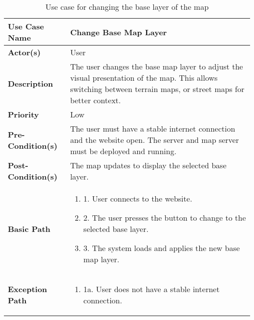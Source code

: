 \begin{table}[h]
    \centering
    \renewcommand{\arraystretch}{1.5}
    \begin{tabularx}{\textwidth}{|l|X|}
        \hline
        \rowcolor{gray!20}
        \textbf{Use Case Name} & Change Base Map Layer \\
        \hline
        \textbf{Actor(s)} & User \\
        \hline
        \textbf{Description} & The user changes the base map layer to adjust the visual presentation of the map. This allows switching between terrain maps, or street maps for better context. \\
        \hline
        \textbf{Priority} & Low \\
        \hline
        \textbf{Pre-Condition(s)} & The user must have a stable internet connection and the website open. The server and map server must be deployed and running. \\
        \hline
        \textbf{Post-Condition(s)} & The map updates to display the selected base layer. \\
        \hline
        \textbf{Basic Path} &  
        \begin{enumerate}[label=,left=0pt]
            \item 1. User connects to the website.
            \item 2. The user presses the button to change to the selected base layer.
            \item 3. The system loads and applies the new base map layer.
        \end{enumerate} \\
        \hline
        \textbf{Exception Path} & 
        \begin{enumerate}[label=,left=0pt]
            \item 1a. User does not have a stable internet connection.
        \end{enumerate} \\
        \hline
    \end{tabularx}
    \caption*{Use case for changing the base layer of the map}
    \label{tab:use_case_base_layer_appendix}
\end{table}